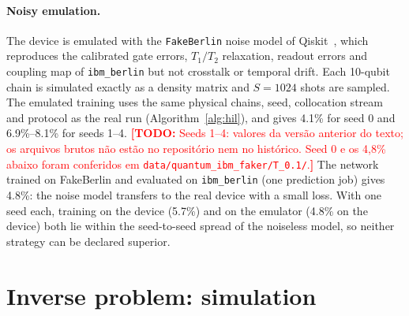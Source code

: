 \documentclass[floatfix,aps,pra,twocolumn,superscriptaddress,10pt,nofootinbib]{revtex4-2}
\newif\ifshowtodos \showtodostrue
\newcommand{\TODO}[1]{\ifshowtodos\textcolor{red}{\textbf{[TODO:} #1\textbf{]}}\fi}
\begin{document}
\begin{appendices}
\paragraph{Noisy emulation.} The device is emulated with the \texttt{FakeBerlin} noise model of Qiskit~\cite{javadiabhari2024qiskit}, which reproduces the calibrated gate errors, $T_1/T_2$ relaxation, readout errors and coupling map of \texttt{ibm\_berlin} but not crosstalk or temporal drift. Each 10-qubit chain is simulated exactly as a density matrix and $S=1024$ shots are sampled. The emulated training uses the same physical chains, seed, collocation stream and protocol as the real run (Algorithm~\ref{alg:hil}), and gives 4.1\% for seed 0 and 6.9\%--8.1\% for seeds 1--4. \TODO{Seeds 1--4: valores da vers\~ao anterior do texto; os arquivos brutos n\~ao est\~ao no reposit\'orio nem no hist\'orico. Seed 0 e os 4,8\% abaixo foram conferidos em \texttt{data/quantum\_ibm\_faker/T\_0.1/}.} The network trained on FakeBerlin and evaluated on \texttt{ibm\_berlin} (one prediction job) gives 4.8\%: the noise model transfers to the real device with a small loss. With one seed each, training on the device (5.7\%) and on the emulator (4.8\% on the device) both lie within the seed-to-seed spread of the noiseless model, so neither strategy can be declared superior.

\section{Inverse problem: simulation}\label{app:isim}


\end{appendices}
\end{document}
